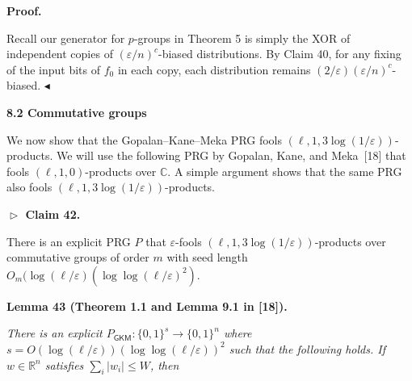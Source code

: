 



\par\medskip\noindent\textbf{Proof.}\par




Recall our generator for $p$-groups in Theorem 5 is simply the XOR of independent copies of $(\varepsilon/n)^{c}$-biased distributions.
By Claim 40, for any fixing of the input bits of $f_{0}$ in each copy, each distribution remains $(2/\varepsilon)(\varepsilon/n)^{c}$-biased.
$\blacktriangleleft$\par






\par\medskip\noindent\textbf{
8.2 Commutative groups}\par




We now show that the Gopalan–Kane–Meka PRG fools $(\ell,1,3\log(1/\varepsilon))$-products.
We will use the following PRG by Gopalan, Kane, and Meka [18] that fools $(\ell,1,0)$-products over $\mathbb{C}$.
A simple argument shows that the same PRG also fools $(\ell,1,3\log(1/\varepsilon))$-products.\par





\par\medskip\noindent\textbf{
$\vartriangleright$ Claim 42. }\par



There is an explicit PRG $P$ that $\varepsilon$-fools $(\ell,1,3\log(1/\varepsilon))$-products over commutative groups of order $m$ with seed length $O_{m}(\log(\ell/\varepsilon)(\log\log(\ell/\varepsilon)^{2})$.\par







\par\medskip\noindent\textbf{
\textbf{Lemma 43}\textbf{ }(Theorem 1.1 and Lemma 9.1 in [18])\textbf{.}
}\par



\emph{There is an explicit $P_{\mathsf{GKM}}\colon\{0,1\}^{s}\to\{0,1\}^{n}$ where $s=O(\log(\ell/\varepsilon))(\log\log(\ell/\varepsilon))^{2}$ such that the following holds.
If $w\in\mathbb{R}^{n}$ satisfies $\sum_{i}\lvert w_{i}\rvert\leq W$, then}\par


